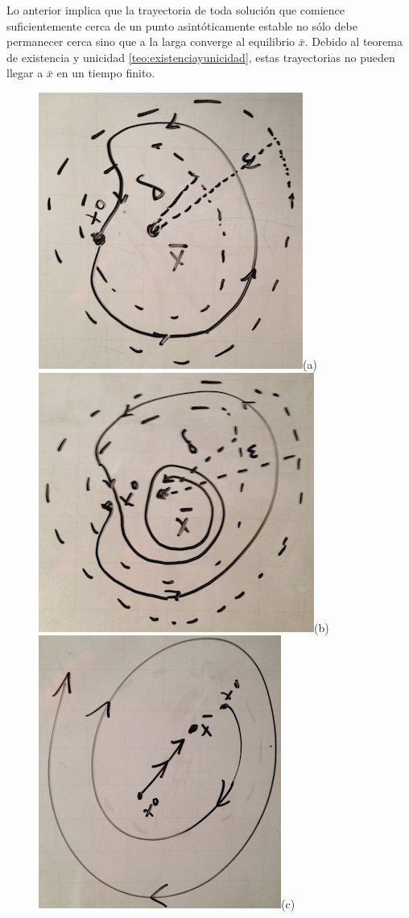 \documentclass[11pt]{book}
\theoremstyle{definition}
\numberwithin{definition}{section}
\theoremstyle{theorem}
\numberwithin{theorem}{section}
\numberwithin{lemma}{section}
\numberwithin{corollary}{section}
\theoremstyle{plain}
\numberwithin{example}{section}
\begin{document}
Lo anterior implica que la trayectoria de toda solución que comience suficientemente cerca de un punto asintóticamente estable no sólo debe permanecer cerca sino que a la larga converge al equilibrio $\bar{x}$. Debido al teorema de existencia y unicidad \ref{teo:existenciayunicidad}, estas trayectorias no pueden llegar a $\bar{x}$ en un tiempo finito.

\begin{figure}[!ht] \centering 
	\includegraphics[scale=0.5]{figures/equilibrium-stable.jpg}(a) \\
	\includegraphics[scale=0.5]{figures/equilibrium-asymptoticallystable.jpg}(b) \\
	\includegraphics[scale=0.5]{figures/equilibrium-unstable.jpg}(c)

\end{figure}
\end{document}
